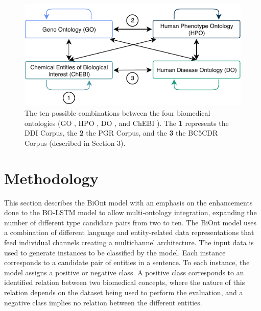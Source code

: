 \begin{figure}[h]
\centering
\includegraphics[width=0.8\linewidth]{images/chapter_3/ecir_2020_1.pdf}
\caption[Ten Possible Combinations Between Four Biomedical Ontologies]{The ten possible combinations between the four biomedical ontologies (\ac{GO} \citep{ashburner2000gene}, \ac{HPO} \citep{kohler2017human}, \ac{DO} \citep{10.1093/nar/gky1032}, and \ac{ChEBI} \citep{hastings2016chebi}). The \textbf{1} represents the \acs{DDI} Corpus, the \textbf{2} the \acs{PGR} Corpus, and the \textbf{3} the \acs{BC5CDR} Corpus (described in Section 3).} \label{fig31}
\end{figure}


\section{Methodology}

This section describes the BiOnt model with an emphasis on the enhancements done to the BO-LSTM \cite{lamurias2019bo} model to allow multi-ontology integration, expanding the number of different type candidate pairs from two to ten. The BiOnt model uses a combination of different language and entity-related data representations that feed individual channels creating a multichannel architecture. The input data is used to generate instances to be classified by the model. Each instance corresponds to a candidate pair of entities in a sentence. To each instance, the model assigns a positive or negative class. A positive class corresponds to an identified relation between two biomedical concepts, where the nature of this relation depends on the dataset being used to perform the evaluation, and a negative class implies no relation between the different entities. 

